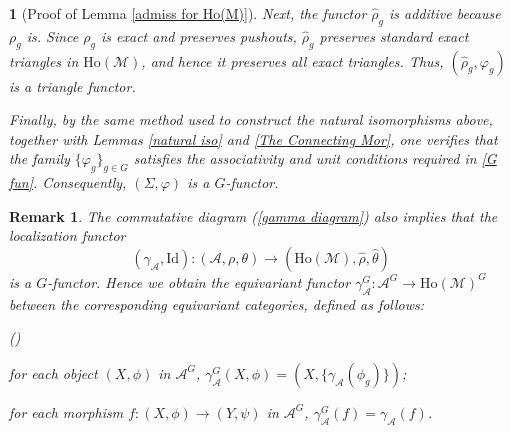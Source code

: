 \documentclass[12pt,twoside]{amsart}
\theoremstyle{bfupright head,slanted body}
\theoremstyle{bfupright head,upright body}
\newtheorem{bfhpg}[res]{}               \newtheorem*{bfhpg*}{}
\theoremstyle{fixed bf head,slanted body}
\theoremstyle{fixed bf head,upright body}
\newtheorem{rmk}[res]{Remark}           \newtheorem*{rmk*}{Remark}
\theoremstyle{numbered paragraph}
\newlength{\thmlistleft}        %
\newlength{\thmlistright}       %
\newlength{\thmlistpartopsep}   %
\newlength{\thmlisttopsep}      %
\newlength{\thmlistparsep}      %
\newlength{\thmlistitemsep}     %
\newcounter{rqm}
\newenvironment{rqm}{\begin{list}{\upshape (\arabic{rqm})}%
    {\usecounter{rqm}%
      \setlength{\leftmargin}{\thmlistleft}%
      \setlength{\labelwidth}{\thmlistleft}%
      \setlength{\rightmargin}{\thmlistright}%
      \setlength{\partopsep}{\thmlistpartopsep}%
      \setlength{\topsep}{\thmlisttopsep}%
      \setlength{\parsep}{\thmlistparsep}%
      \setlength{\itemsep}{\thmlistitemsep}}}%
  {\end{list}}%
\numberwithin{equation}{res}
\newcommand{\calA}{\mathcal{A}}
\newcommand{\calM}{\mathcal{M}}
\newcommand{\Ho}{\mathrm{Ho}}
\newcommand{\Id}{\mathrm{Id}}
\begin{document}
\begin{bfhpg}[Proof of Lemma \ref{admiss for Ho(M)}]
Next, the functor $\widehat{\rho}_g$ is additive because $\rho_g$ is.
Since $\rho_g$ is exact and preserves pushouts, $\widehat{\rho}_g$ preserves standard exact triangles in $\Ho(\calM)$, and hence it preserves all exact triangles.
Thus, $(\widehat{\rho}_g, \varphi_g)$ is a triangle functor.

Finally, by the same method used to construct the natural isomorphisms above, together with Lemmas \ref{natural iso} and \ref{The Connecting Mor}, one verifies that the family $\{\varphi_g\}_{g \in G}$ satisfies the associativity and unit conditions required in \ref{G fun}.
Consequently, $(\mathsf{\Sigma}, \varphi)$ is a $G$-functor.
\qedhere
\end{bfhpg}

\begin{rmk} \label{gamma is G fun}
The commutative diagram (\ref{gamma diagram}) also implies that the localization functor
\[
(\gamma_{\calA}, \Id) : (\calA, \rho, \theta) \to (\Ho(\calM), \widehat{\rho}, \widehat{\theta})
\]
is a $G$-functor.
Hence we obtain the equivariant functor $\gamma_{\calA}^G : \calA^G \to \Ho(\calM)^G$ between the corresponding equivariant categories, defined as follows:
\begin{rqm}
\item[$\bullet$]
for each object $(X, \phi)$ in $\calA^G$, $\gamma_{\calA}^G(X, \phi) = (X, \{\gamma_{\calA}(\phi_g)\})$;

\item[$\bullet$]
for each morphism $f : (X, \phi) \to (Y, \psi)$ in $\calA^G$, $\gamma_{\calA}^G(f) = \gamma_{\calA}(f)$.
\end{rqm}
\end{rmk}
\end{document}
